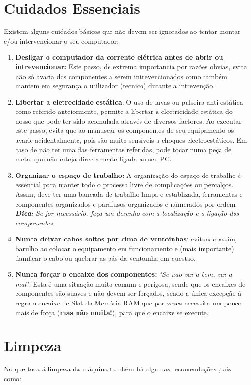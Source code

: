 \section{Cuidados Essenciais}
Existem alguns cuidados básicos que não devem ser ignorados ao tentar montar e/ou intervencionar o seu computador:

\begin{enumerate}
	\item \textbf{Desligar o computador da corrente elétrica antes de abrir ou intrevencionar:} Este passo, de extrema importancia por razões obvias, evita não só avaria dos componentes a serem intrevencionados como também mantem em segurança o utilizador (tecnico) durante a intrevenção.
	\item \textbf{Libertar a eletrecidade estática}: O uso de luvas ou pulseira anti-estática como referido anteiormente, permite a libertar a electricidade estática do nosso que pode ter sido acomulada através de diversos factores. Ao executar este passo, evita que ao manusear os componentes do seu equipamento os avarie acidentalmente, pois são muito sensíveis a choques electroestáticos. Em caso de não ter uma das ferramentas referidas, pode tocar numa peça de metal que não esteja directamente ligada ao seu PC.
	\item \textbf{Organizar o espaço de trabalho:} A organização do espaço de trabalho é essencial para manter todo o processo livre de complicações ou percalços. Assim, deve ter uma bancada de trabalho limpa e establizada, ferramentas e componentes organizados e parafusos organizados e númerados por ordem. \\ 
	\textsl{\textbf{Dica:} Se for necessário, faça um desenho com a localização e a ligação dos componentes}.
	\item \textbf{Nunca deixar cabos soltos por cima de ventoinhas:} evitando assim, barulho ao colocar o equipamento em funcionamento e (mais importante) danificar o cabo ou quebrar as pás da ventoinha em questão. 
	\item \textbf{Nunca forçar o encaixe dos componentes:} \textit{"Se não vai a bem, vai a mal"}. Esta é uma situação muito comum e perigosa, sendo que os encaixes de componentes são suaves e não devem ser forçados, sendo a única excepção á regra o encaixe de Slot da Memória RAM que por vezes necessita um pouco mais de força (\textbf{mas não muita!}), para que o encaixe se execute. 
\end{enumerate}

\section{Limpeza}
No que toca á limpeza da máquina também há algumas recomendações ,tais como:

